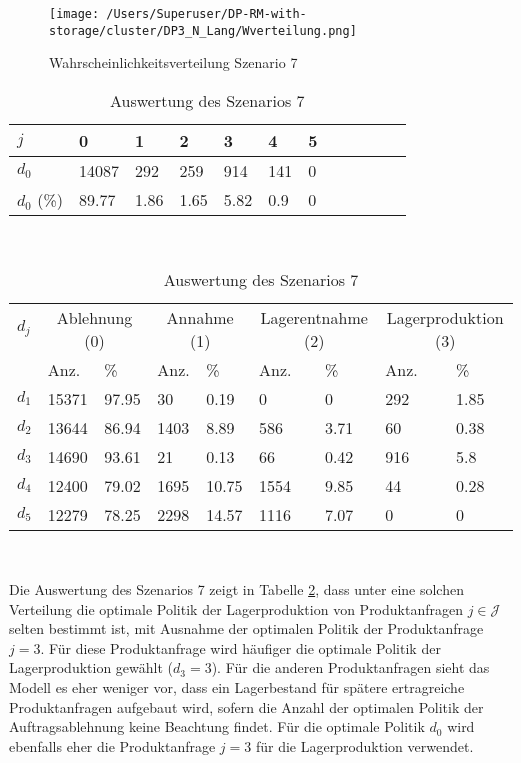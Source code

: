 \begin{figure}[h!]
  \begin{center}
    \texttt{[image: /Users/Superuser/DP-RM-with-storage/cluster/DP3\_N\_Lang/Wverteilung.png]}
    \caption{Wahrscheinlichkeitsverteilung Szenario 7}  \label{SB7}
  \end{center}
\end{figure}

\begin{table}[h!]
\renewcommand{\arraystretch}{1.5}
  \begin{center}
    \caption{Auswertung des Szenarios 7}  \label{AS7}
    \vspace*{3mm}
    \begin{tabular}{l l l l l l l l l l l l }  \hline 
         $j$ & 0 & 1  & 2 & 3 & 4  & 5   \\  \hline
$d_{0}$ &  14087 &   292 &   259 &   914 &  141 &  0 \\
$d_{0}$ (\%) &  89.77 &  1.86 &  1.65 &  5.82 &  0.9 &  0 \\
\hline
    \end{tabular} \\[3mm]
        \begin{tabular}{ l l l l l l l l l}   \hline    %
    $d_j$ & \multicolumn{2}{c}{Ablehnung (0)} & \multicolumn{2}{c}{Annahme (1)}  & \multicolumn{2}{c}{Lagerentnahme (2)} & \multicolumn{2}{c}{Lagerproduktion (3)}\\
    & Anz. & \% & Anz. & \% & Anz. & \% & Anz. & \% \\ \hline 
$d_{1}$ &  15371 &  97.95 &    30 &   0.19 &   0 &   0 &  292 &  1.85 \\
$d_{2}$ &  13644 &  86.94 &  1403 &   8.89 &   586 &  3.71 &   60 &  0.38 \\
$d_{3}$ &  14690 &  93.61 &    21 &   0.13 &    66 &  0.42 &  916 &   5.8 \\
$d_{4}$ &  12400 &  79.02 &  1695 &  10.75 &  1554 &  9.85 &   44 &  0.28 \\
$d_{5}$ &  12279 &  78.25 &  2298 &  14.57 &  1116 &  7.07 &  0 &   0 \\
          \hline
   \end{tabular} \\[3mm]
     \end{center}
\end{table}

Die Auswertung des Szenarios 7 zeigt in Tabelle \ref{AS7}, dass unter eine solchen Verteilung die optimale Politik der Lagerproduktion von Produktanfragen $j\in\mathcal{J}$ selten bestimmt ist, mit Ausnahme der optimalen Politik der Produktanfrage $j=3$. Für diese Produktanfrage wird häufiger die optimale Politik der Lagerproduktion gewählt ($d_3=3$). Für die anderen Produktanfragen sieht das Modell es eher weniger vor, dass ein Lagerbestand für spätere ertragreiche Produktanfragen aufgebaut wird, sofern die Anzahl der optimalen Politik der Auftragsablehnung keine Beachtung findet. Für die optimale Politik $d_0$ wird ebenfalls eher die Produktanfrage $j=3$ für die Lagerproduktion verwendet.\\[.5cm]

